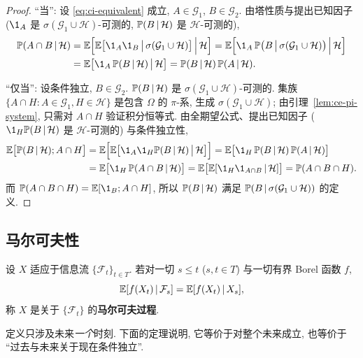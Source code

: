 \begin{proof}
``当'': 设 \eqref{eq:ci-equivalent} 成立, $A\in\mathcal{G}_1$, $B\in\mathcal{G}_2$. 由塔性质与提出已知因子 ($\1_A$ 是 $\sigma(\mathcal{G}_1\cup\mathcal{H})$-可测的, $\P(B\,|\,\mathcal{H})$ 是 $\mathcal{H}$-可测的),
\begin{align*}
\P(A\cap B\,|\,\mathcal{H})&=\E\Big[\E\big[\1_A\1_B\,\big|\,\sigma(\mathcal{G}_1\cup\mathcal{H})\big]\,\Big|\,\mathcal{H}\Big]=\E\Big[\1_A\,\P\big(B\,\big|\,\sigma(\mathcal{G}_1\cup\mathcal{H})\big)\,\Big|\,\mathcal{H}\Big]\\
&=\E\big[\1_A\,\P(B\,|\,\mathcal{H})\,\big|\,\mathcal{H}\big]=\P(B\,|\,\mathcal{H})\,\P(A\,|\,\mathcal{H}).
\end{align*}

``仅当'': 设条件独立, $B\in\mathcal{G}_2$. $\P(B\,|\,\mathcal{H})$ 是 $\sigma(\mathcal{G}_1\cup\mathcal{H})$-可测的. 集族 $\{A\cap H: A\in\mathcal{G}_1,H\in\mathcal{H}\}$ 是包含 $\Omega$ 的 $\pi$-系, 生成 $\sigma(\mathcal{G}_1\cup\mathcal{H})$; 由引理~\ref{lem:ce-pi-system}, 只需对 $A\cap H$ 验证积分恒等式. 由全期望公式、提出已知因子 ($\1_H\P(B\,|\,\mathcal{H})$ 是 $\mathcal{H}$-可测的) 与条件独立性,
\begin{align*}
\E\big[\P(B\,|\,\mathcal{H});A\cap H\big]&=\E\Big[\E\big[\1_A\1_H\P(B\,|\,\mathcal{H})\,\big|\,\mathcal{H}\big]\Big]=\E\big[\1_H\,\P(B\,|\,\mathcal{H})\,\P(A\,|\,\mathcal{H})\big]\\
&=\E\big[\1_H\,\P(A\cap B\,|\,\mathcal{H})\big]=\E\big[\E[\1_H\1_{A\cap B}\,|\,\mathcal{H}]\big]=\P(A\cap B\cap H).
\end{align*}
而 $\P(A\cap B\cap H)=\E[\1_B;A\cap H]$, 所以 $\P(B\,|\,\mathcal{H})$ 满足 $\P(B\,|\,\sigma(\mathcal{G}_1\cup\mathcal{H}))$ 的定义.
\end{proof}

\subsection{马尔可夫性}

\begin{definition}[马尔可夫过程]\label{def:markov}
设 $X$ 适应于信息流 $\{\mathcal{F}_t\}_{t\in T}$. 若对一切 $s\le t$ ($s,t\in T$) 与一切有界 Borel 函数 $f$,
\[
\E[f(X_t)\,|\,\mathcal{F}_s]=\E[f(X_t)\,|\,X_s],
\]
称 $X$ 是关于 $\{\mathcal{F}_t\}$ 的\textbf{马尔可夫过程}.
\end{definition}

定义只涉及未来\emph{一个}时刻. 下面的定理说明, 它等价于对整个未来成立, 也等价于 ``过去与未来关于现在条件独立''.

